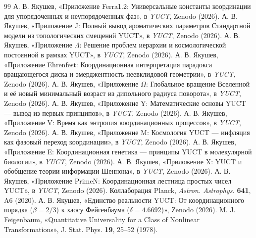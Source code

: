 \documentclass[12pt,a4paper]{article}
\begin{document}
	\begin{thebibliography}{99}
		 А. В. Якушев, «Приложение Ferra1.2: Универсальные константы координации для упорядоченных и неупорядоченных фаз», в \emph{YUCT}, Zenodo (2026).
		 А. В. Якушев, «Приложение J: Полный вывод ароматических параметров Стандартной модели из топологических смещений YUCT», в \emph{YUCT}, Zenodo (2026).
		 А. В. Якушев, «Приложение \(\Lambda\): Решение проблем иерархии и космологической постоянной в рамках YUCT», в \emph{YUCT}, Zenodo (2026).
		 А. В. Якушев, «Приложение Ehrenfest: Координационная интерпретация парадокса вращающегося диска и эмерджентность неевклидовой геометрии», в \emph{YUCT}, Zenodo (2026).
		 А. В. Якушев, «Приложение \(\Omega\): Глобальное вращение Вселенной и её новый минимальный возраст из дипольного радиуса поворота», в \emph{YUCT}, Zenodo (2026).
		 А. В. Якушев, «Приложение Y: Математические основы YUCT — вывод из первых принципов», в \emph{YUCT}, Zenodo (2026).
		 А. В. Якушев, «Приложение V: Время как энтропия координационных процессов», в \emph{YUCT}, Zenodo (2026).
		 А. В. Якушев, «Приложение M: Космология YUCT — инфляция как фазовый переход координации», в \emph{YUCT}, Zenodo (2026).
		 А. В. Якушев, «Приложение E: Координационная генетика — принципы YUCT в молекулярной биологии», в \emph{YUCT}, Zenodo (2026).
		 А. В. Якушев, «Приложение X: YUCT и обобщение теории информации Шеннона», в \emph{YUCT}, Zenodo (2026).
		 А. В. Якушев, «Приложение PrimeN: Координационная лестница простых чисел YUCT», в \emph{YUCT}, Zenodo (2026).
		 Коллаборация Planck, \emph{Astron. Astrophys.} \textbf{641}, A6 (2020).
		 А. В. Якушев, «Единство реальности YUCT: От координационного порядка (\(\beta = 2/3\)) к хаосу Фейгенбаума (\(\delta = 4.6692\))», Zenodo (2026).
		 M. J. Feigenbaum, «Quantitative Universality for a Class of Nonlinear Transformations», J. Stat. Phys. \textbf{19}, 25–52 (1978).
	\end{thebibliography}
	
\end{document}
